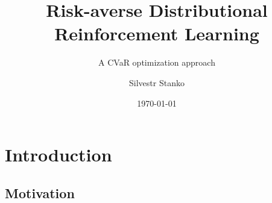 \documentclass{beamer}
\title{Risk-averse Distributional Reinforcement Learning}
\subtitle{A CVaR optimization approach}
\author{Silvestr Stanko\inst{1}}
\institute[] %
{
  \inst{1}%
  Department of Computer Science\\
  Czech Technical University
  }
\date{\today}
\begin{document}
\begin{frame}
  \titlepage
\end{frame}




\section{Introduction}

\subsection{Motivation}

%
%
%

\end{document}
